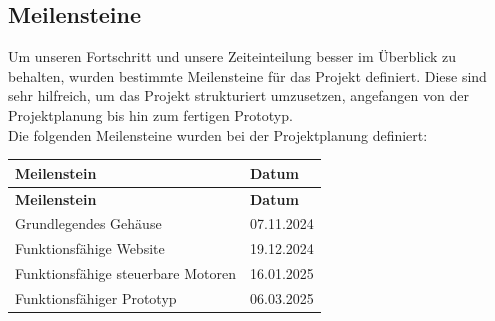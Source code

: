\documentclass[ngerman,12pt,a4paper]{article}
\begin{document}
		\subsection{Meilensteine} %
		Um unseren Fortschritt und unsere Zeiteinteilung besser im Überblick zu behalten, wurden bestimmte Meilensteine für das Projekt definiert. Diese sind sehr hilfreich, um das Projekt strukturiert umzusetzen, angefangen von der Projektplanung bis hin zum fertigen Prototyp. \\[0.5cm]
		Die folgenden Meilensteine wurden bei der Projektplanung definiert:
		\begin{longtable}{| l | l |}
			\hline
			\textbf{Meilenstein} & \textbf{Datum} \\
			\hline
			\endfirsthead
			\hline
			\textbf{Meilenstein} & \textbf{Datum} \\
			\hline
			\endhead
			\hline
			Grundlegendes Gehäuse & 07.11.2024 \\
			\hline
			Funktionsfähige Website & 19.12.2024 \\
			\hline
			Funktionsfähige steuerbare Motoren & 16.01.2025 \\
			\hline
			Funktionsfähiger Prototyp & 06.03.2025 \\
			\hline
		\end{longtable}
		\newpage
\end{document}
